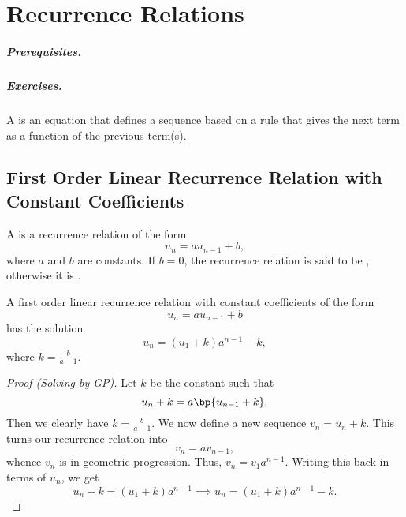 \chapter{Recurrence Relations}

\paragraph{Prerequisites.} 
\paragraph{Exercises.} 

\begin{definition}
    A  is an equation that defines a sequence based on a rule that gives the next term as a function of the previous term(s).
\end{definition}

\section{First Order Linear Recurrence Relation with Constant Coefficients}

\begin{definition}
    A  is a recurrence relation of the form \[u_n = a u_{n-1} + b,\] where $a$ and $b$ are constants. If $b = 0$, the recurrence relation is said to be , otherwise it is .
\end{definition}

\begin{proposition}
    A first order linear recurrence relation with constant coefficients of the form \[u_n = au_{n-1} + b\] has the solution \[u_n = (u_1 + k) a^{n-1} - k,\] where $k = \frac{b}{a - 1}$.
\end{proposition}
\begin{proof}[Proof (Solving by GP)]
    Let $k$ be the constant such that \[u_n + k = a\bp{u_{n-1} + k}.\] Then we clearly have $k = \frac{b}{a - 1}$. We now define a new sequence $v_n = u_n + k$. This turns our recurrence relation into \[v_n = av_{n-1},\] whence $v_n$ is in geometric progression. Thus, $v_n = v_1 a^{n-1}$. Writing this back in terms of $u_n$, we get \[u_n + k = (u_1 + k) a^{n-1} \implies u_n = (u_1 + k)a^{n-1} - k.\]
\end{proof}

